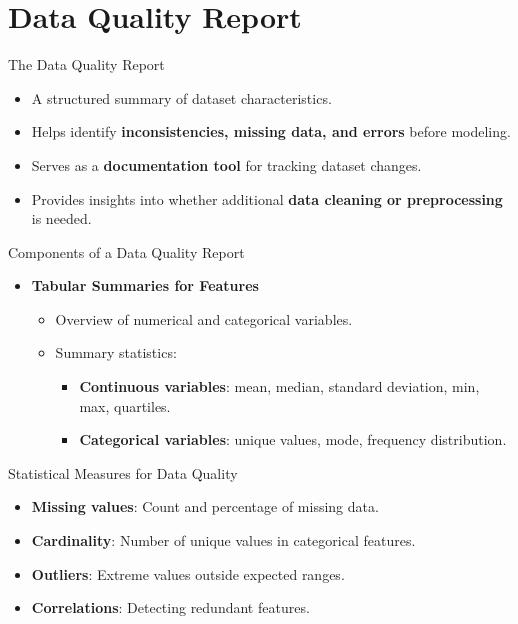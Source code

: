 \documentclass[aspectratio=169,xcolor=dvipsnames]{beamer}
\begin{document}
\section{Data Quality Report}
\begin{frame}{The Data Quality Report}
\begin{itemize}
    \setlength\itemsep{0.5cm}
    \item A structured summary of dataset characteristics.
    \item Helps identify \textbf{inconsistencies, missing data, and errors} before modeling.
    \item Serves as a \textbf{documentation tool} for tracking dataset changes.
    \item Provides insights into whether additional \textbf{data cleaning or preprocessing} is needed.
\end{itemize}
\end{frame}

\begin{frame}{Components of a Data Quality Report}
\begin{itemize}
    \setlength\itemsep{0.5cm}
    \item \textbf{Tabular Summaries for Features}
    \begin{itemize}
    \setlength\itemsep{0.25cm}
        \item Overview of numerical and categorical variables.
        \item Summary statistics:
        \begin{itemize}
        \setlength\itemsep{0.25cm}
            \item \textbf{Continuous variables}: mean, median, standard deviation, min, max, quartiles.
            \item \textbf{Categorical variables}: unique values, mode, frequency distribution.
        \end{itemize}
    \end{itemize}
\end{itemize}
\end{frame}

\begin{frame}{Statistical Measures for Data Quality}
\begin{itemize}
    \setlength\itemsep{0.5cm}
    \item \textbf{Missing values}: Count and percentage of missing data.
    \item \textbf{Cardinality}: Number of unique values in categorical features.
    \item \textbf{Outliers}: Extreme values outside expected ranges.
    \item \textbf{Correlations}: Detecting redundant features.
\end{itemize}
\end{frame}
\end{document}
